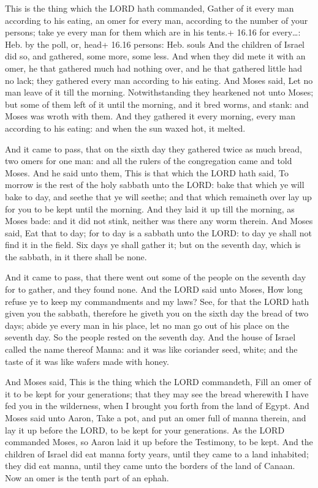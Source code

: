  This is the thing which the LORD hath commanded, Gather
of it every man according to his eating, an omer for every man,
according to the number of your persons; take ye every man for them
which are in his tents.+ 16.16 for every\ldots: Heb. by the poll, or,
head+ 16.16 persons: Heb. souls  And the children of Israel
did so, and gathered, some more, some less.  And when they
did mete it with an omer, he that gathered much had nothing over, and he
that gathered little had no lack; they gathered every man according to
his eating.  And Moses said, Let no man leave of it till
the morning.  Notwithstanding they hearkened not unto
Moses; but some of them left of it until the morning, and it bred worms,
and stank: and Moses was wroth with them.  And they
gathered it every morning, every man according to his eating: and when
the sun waxed hot, it melted.

 And it came to pass, that on the sixth day they gathered
twice as much bread, two omers for one man: and all the rulers of the
congregation came and told Moses.  And he said unto them,
This is that which the LORD hath said, To morrow is the rest of the holy
sabbath unto the LORD: bake that which ye will bake to day, and seethe
that ye will seethe; and that which remaineth over lay up for you to be
kept until the morning.  And they laid it up till the
morning, as Moses bade: and it did not stink, neither was there any worm
therein.  And Moses said, Eat that to day; for to day is a
sabbath unto the LORD: to day ye shall not find it in the field.
 Six days ye shall gather it; but on the seventh day, which
is the sabbath, in it there shall be none.

 And it came to pass, that there went out some of the
people on the seventh day for to gather, and they found none.
 And the LORD said unto Moses, How long refuse ye to keep
my commandments and my laws?  See, for that the LORD hath
given you the sabbath, therefore he giveth you on the sixth day the
bread of two days; abide ye every man in his place, let no man go out of
his place on the seventh day.  So the people rested on the
seventh day.  And the house of Israel called the name
thereof Manna: and it was like coriander seed, white; and the taste of
it was like wafers made with honey.

 And Moses said, This is the thing which the LORD
commandeth, Fill an omer of it to be kept for your generations; that
they may see the bread wherewith I have fed you in the wilderness, when
I brought you forth from the land of Egypt.  And Moses said
unto Aaron, Take a pot, and put an omer full of manna therein, and lay
it up before the LORD, to be kept for your generations.  As
the LORD commanded Moses, so Aaron laid it up before the Testimony, to
be kept.  And the children of Israel did eat manna forty
years, until they came to a land inhabited; they did eat manna, until
they came unto the borders of the land of Canaan.  Now an
omer is the tenth part of an ephah.


